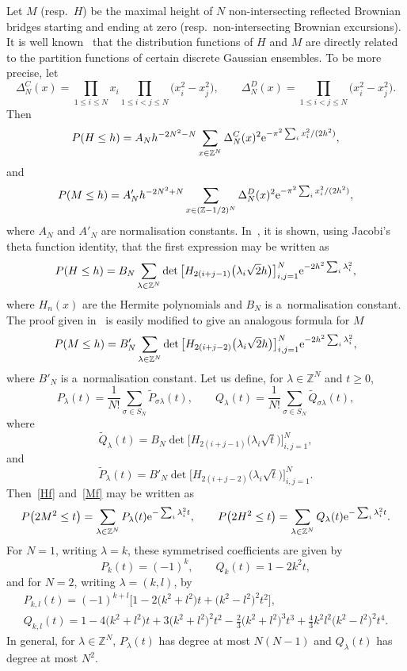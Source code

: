 \documentclass[pdftex]{sigma}
\theoremstyle{definition}
\newcommand\Z{{\mathbb Z}}
\begin{document}
Let $M$ (resp.\ $H$) be the maximal height of $N$ non-intersecting reflected Brownian bridges starting and ending
at zero (resp.\ non-intersecting Brownian excursions).
It is well known~\cite{f,fms,kat,lie} that the distribution functions of $H$ and $M$ are directly related to the
partition functions of certain discrete Gaussian ensembles.
To be more precise, let
\[\Delta^C_N(x)=\prod_{1\le i\le N} x_i \prod_{1\le i<j\le N} \big(x_i^2-x_j^2\big), \qquad \Delta^D_N(x)= \prod_{1\le i<j\le N} \big(x_i^2-x_j^2\big).\]
Then
\[P(H\le h)=A_{N} h^{-2N^2-N} \sum_{x\in \Z^N} \Delta^C_N(x)^2 {\rm e}^{-\pi^2 \sum_i x_i^2/(2h^2)},\]
and
\[P(M\le h)=A'_{N} h^{-2N^2+N} \sum_{x\in (\Z-1/2)^N} \Delta^D_N(x)^2 {\rm e}^{-\pi^2 \sum_i x_i^2/(2h^2)},\]
where $A_{N}$ and $A'_{N}$ are normalisation constants.
In~\cite[Theorem 4]{kat}, it is shown, using Jacobi's theta function identity, that
the first expression may be written as
\begin{equation}\label{Hf}
P(H\le h) = B_N \sum_{\lambda\in \Z^N} \det\big[ H_{2(i+j-1)}\big(\lambda_i \sqrt{2} h\big) \big]_{i,j=1}^N {\rm e}^{- 2h^2 \sum_i \lambda_i^2},\end{equation}
where $H_n(x)$ are the Hermite polynomials and $B_N$ is a~normalisation constant.
The proof given in~\cite{kat} is easily modified to give an analogous formula for $M$
\begin{equation}\label{Mf}
P(M\le h) = B'_N \sum_{\lambda\in \Z^N} \det\big[ H_{2(i+j-2)}\big(\lambda_i\sqrt{2} h\big) \big]_{i,j=1}^N {\rm e}^{-2 h^2 \sum_i \lambda_i^2 },\end{equation}
where $B'_N$ is a~normalisation constant.
Let us define, for $\lambda\in\Z^N$ and $t\ge 0$,
\[P_{\lambda}(t) = \frac1{N!} \sum_{\sigma\in S_N} \tilde P_{\sigma \lambda}(t),\qquad Q_{\lambda}(t) = \frac1{N!} \sum_{\sigma\in S_N} \tilde Q_{\sigma \lambda}(t),\]
where
\[\tilde Q_\lambda(t) = B_N \det\big[ H_{2(i+j-1)}\big(\lambda_i \sqrt{t} \big) \big]_{i,j=1}^N,\]
and \[\tilde P_\lambda(t) = B'_N \det\big[ H_{2(i+j-2)}\big(\lambda_i \sqrt{t} \big) \big]_{i,j=1}^N. \]
Then~\eqref{Hf} and~\eqref{Mf} may be written as
\[P\big(2M^2\le t\big) = \sum_{\lambda\in \Z^N} P_{\lambda}(t) {\rm e}^{- \sum_i \lambda_i^2 t},\qquad P\big(2H^2\le t\big) = \sum_{\lambda\in \Z^N} Q_{\lambda}(t) {\rm e}^{- \sum_i \lambda_i^2 t}.\]
For $N=1$, writing $\lambda=k$, these symmetrised coefficients are given by
\[P_k(t)=(-1)^k,\qquad Q_k(t)=1-2k^2t,\]
and for $N=2$, writing $\lambda=(k,l)$, by
\begin{gather*}
P_{k,l}(t) = (-1)^{k+l}\big[ 1 - 2\big(k^2+l^2\big) t + \big(k^2-l^2\big)^2 t^2\big],\\
Q_{k,l}(t) = 1 - 4\big(k^2+l^2\big) t + 3\big(k^2+l^2\big)^2t^2 -\frac23\big(k^2+l^2\big)^3t^3+\frac43 k^2l^2\big(k^2-l^2\big)^2 t^4.
\end{gather*}
In general, for $\lambda\in\Z^N$, $P_\lambda(t)$ has degree at most $N(N-1)$ and $Q_\lambda(t)$
has degree at most $N^2$.
\end{document}
